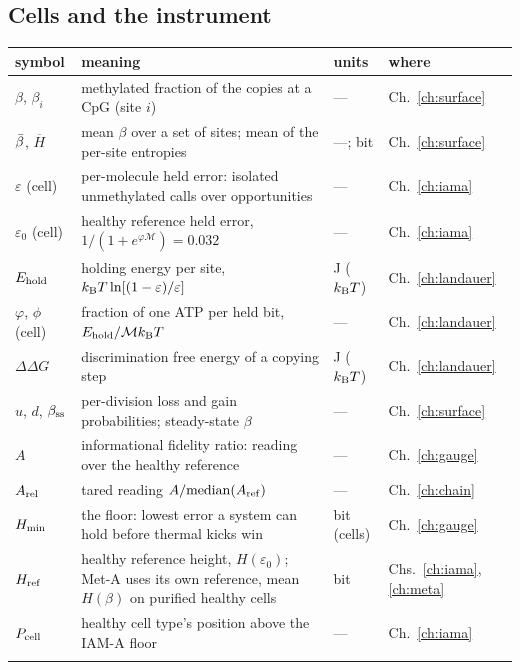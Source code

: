 \subsection*{Cells and the instrument}
{\small\begin{longtable}{@{}>{\raggedright\arraybackslash}p{}>{\raggedright\arraybackslash}p{}>{\raggedright\arraybackslash}p{}>{\raggedright\arraybackslash}p{}@{}}
\toprule symbol & meaning & units & where\\\midrule\endhead
$\beta$, $\beta_i$ & methylated fraction of the copies at a CpG (site $i$) & --- & Ch.~\ref{ch:surface}\\\iamrowrule
$\bar\beta$, $\overline H$ & mean $\beta$ over a set of sites; mean of the per-site entropies & ---; bit & Ch.~\ref{ch:surface}\\\iamrowrule
$\varepsilon$ (cell) & per-molecule held error: isolated unmethylated calls over opportunities & --- & Ch.~\ref{ch:iama}\\\iamrowrule
$\varepsilon_0$ (cell) & healthy reference held error, $1/(1+e^{\varphi\mathcal M})=0.032$ & --- & Ch.~\ref{ch:iama}\\\iamrowrule
$E_{\rm hold}$ & holding energy per site, $k_{\mathrm B} T\ln[(1-\varepsilon)/\varepsilon]$ & J ($k_{\mathrm B} T$) & Ch.~\ref{ch:landauer}\\\iamrowrule
$\varphi$, $\phi$ (cell) & fraction of one ATP per held bit, $E_{\rm hold}/\mathcal Mk_{\mathrm B} T$ & --- & Ch.~\ref{ch:landauer}\\\iamrowrule
$\Delta\Delta G$ & discrimination free energy of a copying step & J ($k_{\mathrm B} T$) & Ch.~\ref{ch:landauer}\\\iamrowrule
$u$, $d$, $\beta_{\rm ss}$ & per-division loss and gain probabilities; steady-state $\beta$ & --- & Ch.~\ref{ch:surface}\\\iamrowrule
$A$ & informational fidelity ratio: reading over the healthy reference & --- & Ch.~\ref{ch:gauge}\\\iamrowrule
$A_{\rm rel}$ & tared reading $A/\mathrm{median}(A_{\rm ref})$ & --- & Ch.~\ref{ch:chain}\\\iamrowrule
$H_{\min}$ & the floor: lowest error a system can hold before thermal kicks win & bit (cells) & Ch.~\ref{ch:gauge}\\\iamrowrule
$H_{\rm ref}$ & healthy reference height, $H(\varepsilon_0)$; Met-A uses its own reference, mean $H(\beta)$ on purified healthy cells & bit & Chs.~\ref{ch:iama}, \ref{ch:meta}\\\iamrowrule
$P_{\rm cell}$ & healthy cell type's position above the IAM-A floor & --- & Ch.~\ref{ch:iama}\\\iamrowrule

\end{longtable}}
